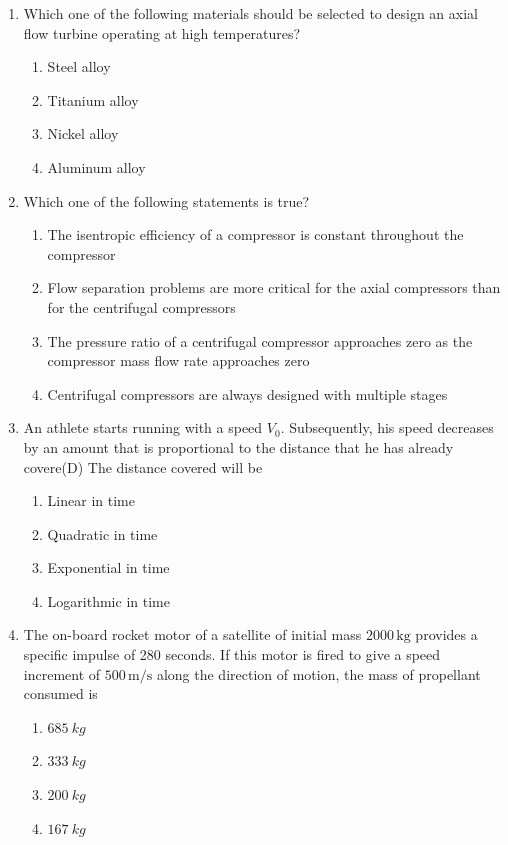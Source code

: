 \documentclass{article}
\begin{document}
\begin{enumerate}
    \item Which one of the following materials should be selected to design an axial flow turbine operating at high temperatures?
    \begin{multicols}{2}
    \begin{enumerate}
        \item Steel alloy
        \item Titanium alloy
        \item Nickel alloy
        \item Aluminum alloy
    \end{enumerate}
    \end{multicols}
        

    \item Which one of the following statements is true?
    \begin{enumerate}
        \item The isentropic efficiency of a compressor is constant throughout the compressor
        \item Flow separation problems are more critical for the axial compressors than for the centrifugal compressors
        \item The pressure ratio of a centrifugal compressor approaches zero as the compressor mass flow rate approaches zero
        \item Centrifugal compressors are always designed with multiple stages 
    \end{enumerate}
        

    \item An athlete starts running with a speed $V_0$. Subsequently, his speed decreases by an amount that is proportional to the distance that he has already covere(D) The distance covered will be
    \begin{enumerate}
        \item Linear in time
        \item Quadratic in time
        \item Exponential in time
        \item Logarithmic in time 
    \end{enumerate}

    \item The on-board rocket motor of a satellite of initial mass $2000 \, \mathrm{kg}$ provides a specific impulse of 280 seconds. If this motor is fired to give a speed increment of $500 \, \mathrm{m/s}$ along the direction of motion, the mass of propellant consumed is
    \begin{enumerate}
        \item $685 \ kg$
        \item $333 \ kg$
        \item $200 \ kg$
        \item $167 \ kg$ 
    \end{enumerate}
        


\end{enumerate}
\end{document}
